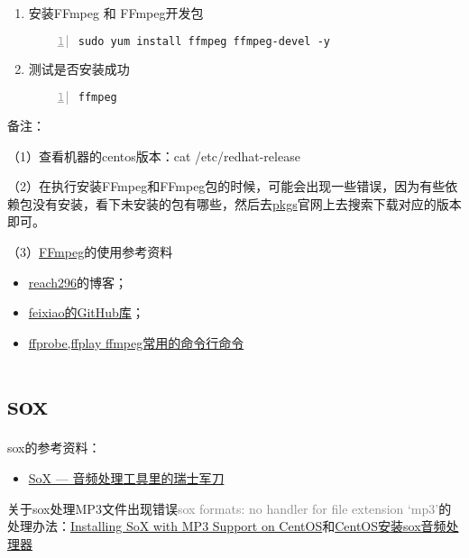 \begin{enumerate}
\item 安装FFmpeg 和 FFmpeg开发包
\begin{lstlisting}[language = shell, numbers=left, 
         numberstyle=\tiny,keywordstyle=\color{blue!70},
         commentstyle=\color{red!50!green!50!blue!50},frame=shadowbox,
         rulesepcolor=\color{red!20!green!20!blue!20},basicstyle=\ttfamily]
sudo yum install ffmpeg ffmpeg-devel -y
\end{lstlisting}
\item 测试是否安装成功
\begin{lstlisting}[language = shell, numbers=left, 
         numberstyle=\tiny,keywordstyle=\color{blue!70},
         commentstyle=\color{red!50!green!50!blue!50},frame=shadowbox,
         rulesepcolor=\color{red!20!green!20!blue!20},basicstyle=\ttfamily]
ffmpeg
\end{lstlisting}
\end{enumerate}

备注：

（1）查看机器的centos版本：cat /etc/redhat-release

（2）在执行安装FFmpeg和FFmpeg包的时候，可能会出现一些错误，因为有些依赖包没有安装，看下未安装的包有哪些，然后去\href{https://pkgs.org}{pkgs}官网上去搜索下载对应的版本即可。

（3）\href{http://ffmpeg.org/}{FFmpeg}的使用参考资料
	\begin{itemize}
		\item \href{https://www.cnblogs.com/reach296/p/4002020.html}{reach296}的博客；
		\item \href{https://github.com/feixiao/ffmpeg}{feixiao的GitHub库}；
		\item \href{https://juejin.im/post/5a59993cf265da3e4f0a1e4b}{ffprobe,ffplay ffmpeg常用的命令行命令}
	\end{itemize}

\section{sox}
sox的参考资料：
\begin{itemize}
	\item \href{https://rollingstarky.github.io/2018/12/18/processing-audio-with-sox/}{SoX — 音频处理工具里的瑞士军刀}
\end{itemize}

关于sox处理MP3文件出现错误\textcolor{grey}{sox formats: no handler for file extension `mp3'}的处理办法：\href{https://arstech.net/installing-sox-with-mp3-support-on-centos/}{Installing SoX with MP3 Support on CentOS}和\href{https://blog.csdn.net/lzg5x/article/details/79901812}{CentOS安装sox音频处理器}

